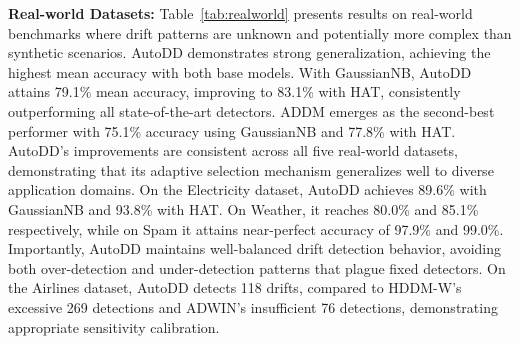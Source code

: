 \documentclass{article}
\begin{document}
\textbf{Real-world Datasets:} Table~\ref{tab:realworld} presents results on real-world benchmarks where drift patterns are unknown and potentially more complex than synthetic scenarios. AutoDD demonstrates strong generalization, achieving the highest mean accuracy with both base models. With GaussianNB, AutoDD attains 79.1\% mean accuracy, improving to 83.1\% with HAT, consistently outperforming all state-of-the-art detectors. ADDM emerges as the second-best performer with 75.1\% accuracy using GaussianNB and 77.8\% with HAT. AutoDD's improvements are consistent across all five real-world datasets, demonstrating that its adaptive selection mechanism generalizes well to diverse application domains. On the Electricity dataset, AutoDD achieves 89.6\% with GaussianNB and 93.8\% with HAT. On Weather, it reaches 80.0\% and 85.1\% respectively, while on Spam it attains near-perfect accuracy of 97.9\% and 99.0\%. Importantly, AutoDD maintains well-balanced drift detection behavior, avoiding both over-detection and under-detection patterns that plague fixed detectors. On the Airlines dataset, AutoDD detects 118 drifts, compared to HDDM-W's excessive 269 detections and ADWIN's insufficient 76 detections, demonstrating appropriate sensitivity calibration.
\end{document}
